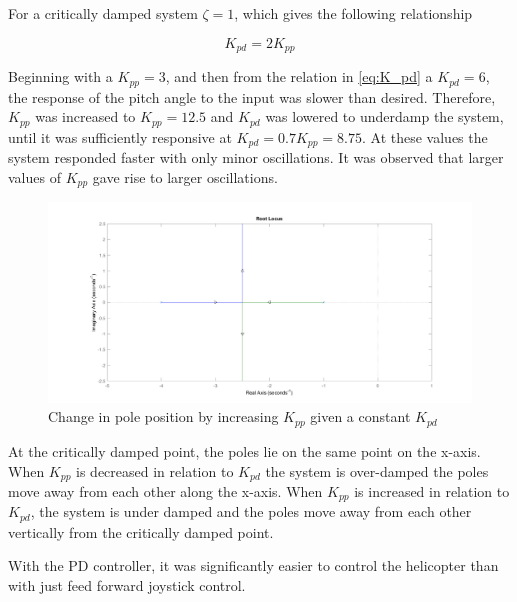 For a critically damped system $\zeta = 1$, which gives the following relationship

\begin{equation}
  \label{eq:K_pd}
  K_{pd} = 2K_{pp}
\end{equation}

Beginning with a $K_{pp} = 3$, and then from the relation in \cref{eq:K_pd} a $K_{pd} = 6$, the response of the pitch angle
to the input was slower than desired. Therefore, $K_{pp}$ was
increased to $K_{pp} = 12.5$ and $K_{pd}$ was lowered to underdamp the
system, until it  was sufficiently responsive at $K_{pd} = 0.7K_{pp} =
8.75$. At these values the system responded faster with only minor
oscillations. It was observed that larger values of $K_{pp}$ gave rise
to larger oscillations.

\begin{figure}[H]
  \caption{Change in pole position by increasing $K_{pp}$ given a constant $K_{pd}$}
  \label{fig:root_locus}
  \includegraphics[width=\textwidth]{images/root_locus}
\end{figure}

At the critically damped point, the poles lie on the same point on
the x-axis. When $K_{pp}$ is decreased in relation to $K_{pd}$ the system is
over-damped the poles move away from each other along the x-axis.
When $K_{pp}$ is increased in relation to $K_{pd}$, the system is under damped
and the poles move away from each other vertically from the critically
damped point.

With the PD controller, it was significantly easier to control the
helicopter than with just feed forward joystick control.


